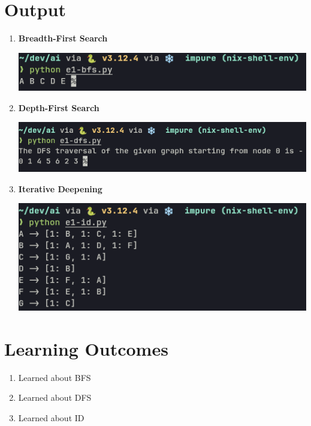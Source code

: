 \documentclass[12pt]{fphw}
\begin{document}
\section{Output}
\begin{enumerate}
  \item \textbf{Breadth-First Search}
\begin{center}
  \includegraphics[width=0.5\columnwidth]{./e1-bfs.png}
\end{center}
\item \textbf{Depth-First Search}
  \begin{center}
    \includegraphics[width=0.5\columnwidth]{./e1-dfs.png}
  \end{center}
\item \textbf{Iterative Deepening}
  \begin{center}
    \includegraphics[width=0.5\columnwidth]{./e1-id.png}
  \end{center}
\end{enumerate}
\section{Learning Outcomes}
\begin{enumerate}
  \item Learned about BFS
  \item Learned about DFS
  \item Learned about ID
\end{enumerate}
\end{document}
